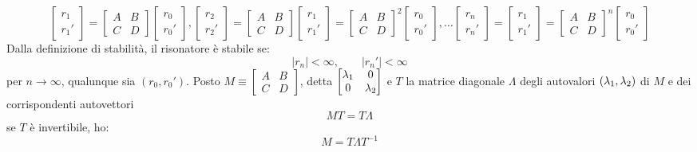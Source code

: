 \begin{equation*}
\begin{bmatrix}
r_1\\
r_1'
\end{bmatrix} = 
\begin{bmatrix}
A	&	B\\
C	&	D
\end{bmatrix}
\begin{bmatrix}
r_0\\
r_0'
\end{bmatrix},
\begin{bmatrix}
r_2\\
r_2'
\end{bmatrix} = 
\begin{bmatrix}
A	&	B\\
C	&	D
\end{bmatrix}
\begin{bmatrix}
r_1\\
r_1'
\end{bmatrix} =
\begin{bmatrix}
A	&	B\\
C	&	D
\end{bmatrix}^2
\begin{bmatrix}
r_0\\
r_0'
\end{bmatrix},\dots
\begin{bmatrix}
r_n\\
r_n'
\end{bmatrix}
=\begin{bmatrix}
r_1\\
r_1'
\end{bmatrix} = 
\begin{bmatrix}
A	&	B\\
C	&	D
\end{bmatrix}^n
\begin{bmatrix}
r_0\\
r_0'
\end{bmatrix}
\end{equation*}
Dalla definizione di stabilità, il risonatore è stabile se:
\begin{equation*}
|r_n| < \infty, \qquad |r_n'| < \infty
\end{equation*}
per $n\rightarrow \infty$, qualunque sia $(r_0, r_0')$.
Posto $M \equiv \begin{bmatrix}
A	&	B\\
C	&	D
\end{bmatrix}$, detta $\begin{bmatrix}
\lambda_1	&	0\\
0	&	\lambda_2
\end{bmatrix}$ e $T$ la matrice diagonale $\Lambda$ degli autovalori $(\lambda_1,\lambda_2)$ di $M$ e dei corrispondenti autovettori
\begin{equation*}
MT = T\Lambda
\end{equation*}
se $T$ è invertibile, ho:
\begin{equation*}
M = T\Lambda T^{-1}
\end{equation*}



